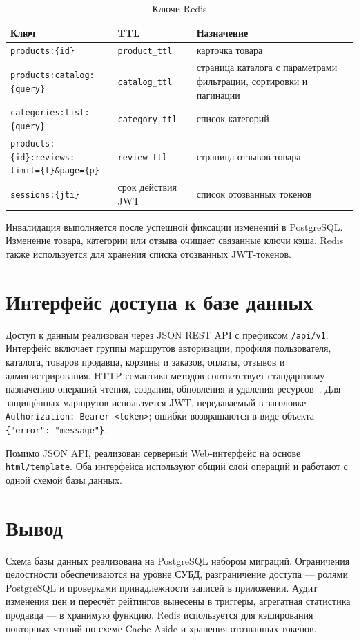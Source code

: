 \begin{table}[H]
    \caption{Ключи Redis}
    \label{tbl:redis_keys}
    {\small
    \begin{tabular}{|p{}|p{}|p{}|}
        \hline
        \textbf{Ключ} & \textbf{TTL} & \textbf{Назначение} \\ \hline
        \texttt{products:\{id\}} & \texttt{product\_ttl} & карточка товара \\ \hline
        \texttt{products:catalog:\{query\}} & \texttt{catalog\_ttl} & страница каталога с параметрами фильтрации, сортировки и пагинации \\ \hline
        \texttt{categories:list:\{query\}} & \texttt{category\_ttl} & список категорий \\ \hline
        \makecell[l]{\texttt{products:\{id\}:reviews:}\\\texttt{limit=\{l\}\&page=\{p\}}} & \texttt{review\_ttl} & страница отзывов товара \\ \hline
        \texttt{sessions:\{jti\}} & срок действия JWT & список отозванных токенов \\ \hline
    \end{tabular}
    }
\end{table}

Инвалидация выполняется после успешной фиксации изменений в PostgreSQL. Изменение товара, категории или отзыва очищает связанные ключи кэша. Redis также используется для хранения списка отозванных JWT-токенов.

\section{Интерфейс доступа к базе данных}

Доступ к данным реализован через JSON REST API с префиксом \texttt{/api/v1}. Интерфейс включает группы маршрутов авторизации, профиля пользователя, каталога, товаров продавца, корзины и заказов, оплаты, отзывов и администрирования. HTTP-семантика методов соответствует стандартному назначению операций чтения, создания, обновления и удаления ресурсов~\cite{http_semantics}. Для защищённых маршрутов используется JWT, передаваемый в заголовке \texttt{Authorization: Bearer <token>}; ошибки возвращаются в виде объекта \texttt{\{"error": "message"\}}.

Помимо JSON API, реализован серверный Web-интерфейс на основе \texttt{html/template}. Оба интерфейса используют общий слой операций и работают с одной схемой базы данных.

\section*{Вывод}

Схема базы данных реализована на PostgreSQL набором миграций. Ограничения целостности обеспечиваются на уровне СУБД, разграничение доступа --- ролями PostgreSQL и проверками принадлежности записей в приложении. Аудит изменения цен и пересчёт рейтингов вынесены в триггеры, агрегатная статистика продавца --- в хранимую функцию. Redis используется для кэширования повторных чтений по схеме Cache-Aside и хранения отозванных токенов.
